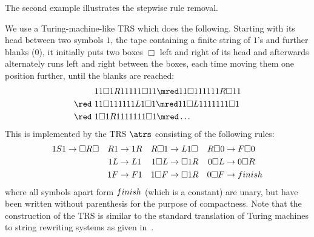 The second example illustrates the stepwise rule removal.
\begin{example}\label{ex:TM}{\newcommand{\free}{1}      \newcommand{\sright}{R}
  \newcommand{\sleft}{L}
  \newcommand{\slleft}{F}
  \newcommand{\wall}{\Box}   \newcommand{\blank}{0}     \newcommand{\start}{S}
  \newcommand{\tm}{\msf{M}}
  \newcommand{\finish}{\mit{finish}}
We use a Turing-machine-like TRS which does the following.
  Starting with its head between two symbols $\free$, the tape
  containing  a finite string of $\free$'s and further blanks ($\blank$),
  it initially puts two boxes $\wall$ left and right of its head
  and afterwards alternately runs left and right between the boxes,
  each time moving them one position further, until 
the blanks are reached:
  \begin{align*}
    &\free\free\wall\free\sright\free\free\free\free\free\wall\free\free
    \mred \free\free\wall\free\free\free\free\free\free\sright\wall\free\free\\
    \red\ &\free\free\wall\free\free\free\free\free\free\sleft\free\wall\free
    \mred \free\free\wall\sleft\free\free\free\free\free\free\free\wall\free\\
    \red\ &\free\wall\free\sright\free\free\free\free\free\free\free\wall\free \mred \ldots
  \end{align*}
This is implemented by the TRS $\atrs$ consisting of the following rules:
\begin{align*}
    \free\start\free &\to \wall\sright\wall &
    \sright\free &\to \free\sright &
    \sright\wall\free &\to \sleft\free\wall &
    \sright\wall\blank &\to \slleft\wall\blank \\
    &&
    \free\sleft &\to \sleft\free &
    \free\wall\sleft &\to \wall\free\sright &
    \blank\wall\sleft &\to \blank\wall\sright \\
    &&
    \free\slleft &\to \slleft\free &
    \free\wall\slleft &\to \wall\free\sright &
    \blank\wall\slleft &\to \finish
\end{align*}
  where all symbols apart form $\finish$ (which is a constant) are unary,
  but have been written without parenthesis for the purpose of compactness.
  Note that the construction of the TRS is similar to
 the standard translation of Turing machines
  to string rewriting systems as given in~\cite{terese:03}.

}
\end{example}
